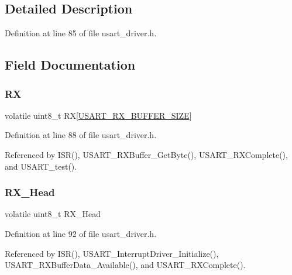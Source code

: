 \subsection{Detailed Description}


Definition at line 85 of file usart\+\_\+driver.\+h.



\subsection{Field Documentation}
\hypertarget{struct_u_s_a_r_t___buffer_a3b83538f34138ed63ae42daeaa092639}{}\label{struct_u_s_a_r_t___buffer_a3b83538f34138ed63ae42daeaa092639} 
\subsubsection{\texorpdfstring{RX}{RX}}
{\footnotesize\ttfamily volatile uint8\+\_\+t RX\mbox{[}\hyperlink{usart__driver_8h_ac0999c0821d14cfab43e6f3c778c2b95}{U\+S\+A\+R\+T\+\_\+\+R\+X\+\_\+\+B\+U\+F\+F\+E\+R\+\_\+\+S\+I\+ZE}\mbox{]}}



Definition at line 88 of file usart\+\_\+driver.\+h.



Referenced by I\+S\+R(), U\+S\+A\+R\+T\+\_\+\+R\+X\+Buffer\+\_\+\+Get\+Byte(), U\+S\+A\+R\+T\+\_\+\+R\+X\+Complete(), and U\+S\+A\+R\+T\+\_\+test().

\hypertarget{struct_u_s_a_r_t___buffer_aca7bb6ebcc2a3f266fac41649a250041}{}\label{struct_u_s_a_r_t___buffer_aca7bb6ebcc2a3f266fac41649a250041} 
\subsubsection{\texorpdfstring{R\+X\+\_\+\+Head}{RX\_Head}}
{\footnotesize\ttfamily volatile uint8\+\_\+t R\+X\+\_\+\+Head}



Definition at line 92 of file usart\+\_\+driver.\+h.



Referenced by I\+S\+R(), U\+S\+A\+R\+T\+\_\+\+Interrupt\+Driver\+\_\+\+Initialize(), U\+S\+A\+R\+T\+\_\+\+R\+X\+Buffer\+Data\+\_\+\+Available(), and U\+S\+A\+R\+T\+\_\+\+R\+X\+Complete().

